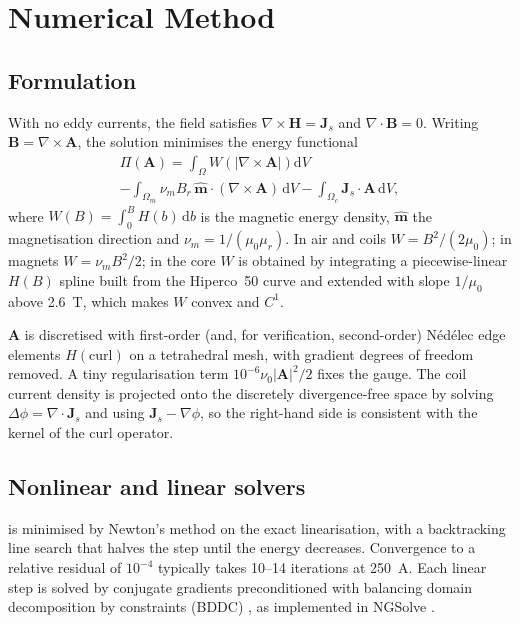 \documentclass[journal]{IEEEtran}
\begin{document}
\section{Numerical Method}\label{sec:method}

\subsection{Formulation}
With no eddy currents, the field satisfies $\nabla\times\bm{H}=\bm{J}_s$ and $\nabla\cdot\bm{B}=0$. Writing $\bm{B}=\nabla\times\bm{A}$, the solution minimises the energy functional
\begin{multline}
\Pi(\bm{A})=\int_\Omega W\!\left(|\nabla\times\bm{A}|\right)\mathrm{d}V\\
-\int_{\Omega_m}\nu_m B_r\,\hat{\bm{m}}\cdot(\nabla\times\bm{A})\,\mathrm{d}V-\int_{\Omega_c}\bm{J}_s\cdot\bm{A}\,\mathrm{d}V,
\label{eq:energy}
\end{multline}
where $W(B)=\int_0^B H(b)\,\mathrm{d}b$ is the magnetic energy density, $\hat{\bm{m}}$ the magnetisation direction and $\nu_m=1/(\mu_0\mu_r)$. In air and coils $W=B^2/(2\mu_0)$; in magnets $W=\nu_m B^2/2$; in the core $W$ is obtained by integrating a piecewise-linear $H(B)$ spline built from the Hiperco~50 curve and extended with slope $1/\mu_0$ above \SI{2.6}{T}, which makes $W$ convex and $C^1$.

$\bm{A}$ is discretised with first-order (and, for verification, second-order) N\'ed\'elec edge elements $H(\mathrm{curl})$ \cite{nedelec1980} on a tetrahedral mesh, with gradient degrees of freedom removed. A tiny regularisation term $10^{-6}\nu_0|\bm{A}|^2/2$ fixes the gauge. The coil current density is projected onto the discretely divergence-free space by solving $\Delta\phi=\nabla\cdot\bm{J}_s$ and using $\bm{J}_s-\nabla\phi$, so the right-hand side is consistent with the kernel of the curl operator.

\subsection{Nonlinear and linear solvers}
 is minimised by Newton's method on the exact linearisation, with a backtracking line search that halves the step until the energy decreases. Convergence to a relative residual of $10^{-4}$ typically takes 10--14 iterations at \SI{250}{A}. Each linear step is solved by conjugate gradients preconditioned with balancing domain decomposition by constraints (BDDC) \cite{mandel1997}, as implemented in NGSolve \cite{schoberl2014}.
\end{document}
